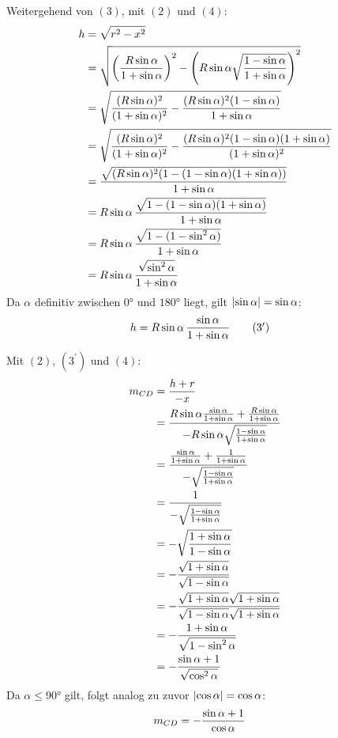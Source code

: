 \goodbreak
\begin{samepage}
	Weitergehend von $(3)$, mit $(2)$ und $(4)$: \nopagebreak
	\begin{align*}
		h &= \sqrt{r^2-x^2} \\
		&= \sqrt{\left(\frac{R\sin\alpha}{1+\sin\alpha}\right)^2 - \left(R\sin\alpha\sqrt{\frac{1-\sin\alpha}{1+\sin\alpha}}\right)^2} \\
		&= \sqrt{\frac{(R\sin\alpha)^2}{(1+\sin\alpha)^2} - \frac{(R\sin\alpha)^2(1-\sin\alpha)}{1+\sin\alpha}} \\
		&= \sqrt{\frac{(R\sin\alpha)^2}{(1+\sin\alpha)^2} - \frac{(R\sin\alpha)^2(1-\sin\alpha)(1+\sin\alpha)}{(1+\sin\alpha)^2}} \\
		&= \frac{\sqrt{(R\sin\alpha)^2(1-(1-\sin\alpha)(1+\sin\alpha))}}{1+\sin\alpha} \\
		&= R\sin\alpha \, \frac{\sqrt{1-(1-\sin\alpha)(1+\sin\alpha)}}{1+\sin\alpha} \\
		&= R\sin\alpha \, \frac{\sqrt{1-(1-\sin^2\alpha)}}{1+\sin\alpha} \\
		&= R\sin\alpha \, \frac{\sqrt{\sin^2\alpha}}{1+\sin\alpha}
	\end{align*}
	Da $\alpha$ definitiv zwischen $\ang{0}$ und $\ang{180}$ liegt, gilt $\left|\sin\alpha\right| = \sin\alpha$:
	\begin{align*}
		h &= R\sin\alpha \, \frac{\sin\alpha}{1+\sin\alpha} \tag{$3^\prime$}
	\end{align*}
\end{samepage}
Mit $(2)$, $(3^\prime)$ und $(4)$: \nopagebreak
\begin{align*}
	m_{CD} &= \frac{h+r}{-x} \\
	&= \frac{R\sin\alpha \frac{\sin\alpha}{1+\sin\alpha} + \frac{R\sin\alpha}{1+\sin\alpha}}{-R\sin\alpha\sqrt{\frac{1-\sin\alpha}{1+\sin\alpha}}} \\
	&= \frac{\frac{\sin\alpha}{1+\sin\alpha}+\frac{1}{1+\sin\alpha}}{-\sqrt{\frac{1-\sin\alpha}{1+\sin\alpha}}} \\
	&= \frac{1}{-\sqrt{\frac{1-\sin\alpha}{1+\sin\alpha}}} \\
	&= -\sqrt{\frac{1+\sin\alpha}{1-\sin\alpha}} \\
	&= -\frac{\sqrt{1+\sin\alpha}}{\sqrt{1-\sin\alpha}} \\
	&= -\frac{\sqrt{1+\sin\alpha}\sqrt{1+\sin\alpha}}{\sqrt{1-\sin\alpha}\sqrt{1+\sin\alpha}} \\
	&= -\frac{1+\sin\alpha}{\sqrt{1 - \sin^2\alpha}} \\
	&= -\frac{\sin\alpha+1}{\sqrt{\cos^2\alpha}}
\end{align*}
Da $\alpha \leq \ang{90}$ gilt, folgt analog zu zuvor $\left|\cos\alpha\right| = \cos\alpha$:
\begin{align*}
	m_{CD} &= -\frac{\sin\alpha+1}{\cos\alpha}
\end{align*}
